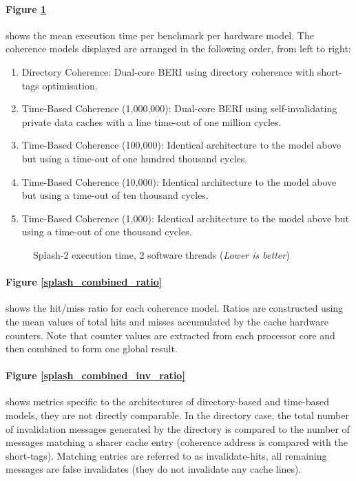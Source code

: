 		\paragraph{Figure \ref{splash_combined}} shows the mean execution time per benchmark per hardware model. The coherence models displayed are arranged in the following order, from left to right:
			\begin{enumerate}
				\item Directory Coherence: Dual-core BERI using directory coherence with short-tags optimisation.
				\item Time-Based Coherence (1,000,000): Dual-core BERI using self-invalidating private data caches with a line time-out of one million cycles.
				\item Time-Based Coherence (100,000): Identical architecture to the model above but using a time-out of one hundred thousand cycles.
				\item Time-Based Coherence (10,000): Identical architecture to the model above but using a time-out of ten thousand cycles.
				\item Time-Based Coherence (1,000): Identical architecture to the model above but using a time-out of one thousand cycles.
			\end{enumerate}

		\begin{figure}[!b]
		\centering 
			\caption[Splash-2 execution time, 2 software threads]{Splash-2 execution time, 2 software threads (\textit{Lower is better})} 
			\label{splash_combined}
		\end{figure}

		\paragraph{Figure \ref{splash_combined_ratio}} shows the hit/miss ratio for each coherence model. Ratios are constructed using the mean values of total hits and misses accumulated by the cache hardware counters. Note that counter values are extracted from each processor core and then combined to form one global result.
		
		\paragraph{Figure \ref{splash_combined_inv_ratio}} shows metrics specific to the architectures of directory-based and time-based models, they are not directly comparable. In the directory case, the total number of invalidation messages generated by the directory is compared to the number of messages matching a sharer cache entry (coherence address is compared with the short-tags). Matching entries are referred to as invalidate-hits, all remaining messages are false invalidates (they do not invalidate any cache lines). 
		
